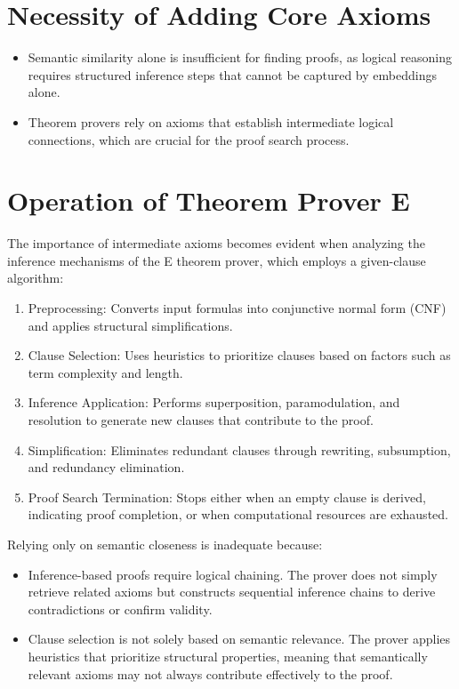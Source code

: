 \documentclass[english,version-2020-11]{uzl-thesis}
\begin{document}
\section{Necessity of Adding Core Axioms}
\begin{itemize}
    \item Semantic similarity alone is insufficient for finding proofs, as logical reasoning requires structured inference steps that cannot be captured by embeddings alone.
    \item Theorem provers rely on axioms that establish intermediate logical connections, which are crucial for the proof search process.
\end{itemize}

\section{Operation of Theorem Prover E}
The importance of intermediate axioms becomes evident when analyzing the inference mechanisms of the E theorem prover, which employs a given-clause algorithm:

\begin{enumerate}
    \item Preprocessing: Converts input formulas into conjunctive normal form (CNF) and applies structural simplifications.
    \item Clause Selection: Uses heuristics to prioritize clauses based on factors such as term complexity and length.
    \item Inference Application: Performs superposition, paramodulation, and resolution to generate new clauses that contribute to the proof.
    \item Simplification: Eliminates redundant clauses through rewriting, subsumption, and redundancy elimination.
    \item Proof Search Termination: Stops either when an empty clause is derived, indicating proof completion, or when computational resources are exhausted.
\end{enumerate}

Relying only on semantic closeness is inadequate because:
\begin{itemize}
    \item Inference-based proofs require logical chaining. The prover does not simply retrieve related axioms but constructs sequential inference chains to derive contradictions or confirm validity.
    \item Clause selection is not solely based on semantic relevance. The prover applies heuristics that prioritize structural properties, meaning that semantically relevant axioms may not always contribute effectively to the proof.
\end{itemize}
\end{document}
